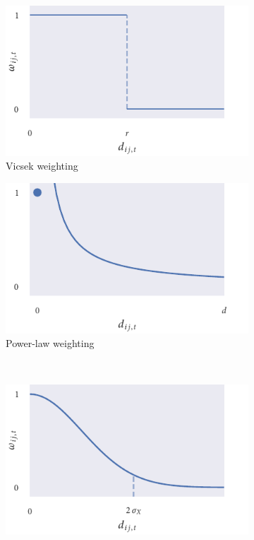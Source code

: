 \begin{figure}[tb]
  \begin{subfigure}[b]{0.5\textwidth}
    \caption{Vicsek weighting}
    \label{fig:vicsek_weight}
    \includegraphics{vicsek_weighting.pdf}
  \end{subfigure}%
  \begin{subfigure}[b]{0.5\textwidth}
    \caption{Power-law weighting}
    \label{fig:power_weight}
    \includegraphics{power_weighting.pdf}
  \end{subfigure}\\
  \begin{subfigure}[b]{0.5\textwidth}
    \includegraphics{gaussian_weighting.pdf}

\end{subfigure}
\end{figure}
